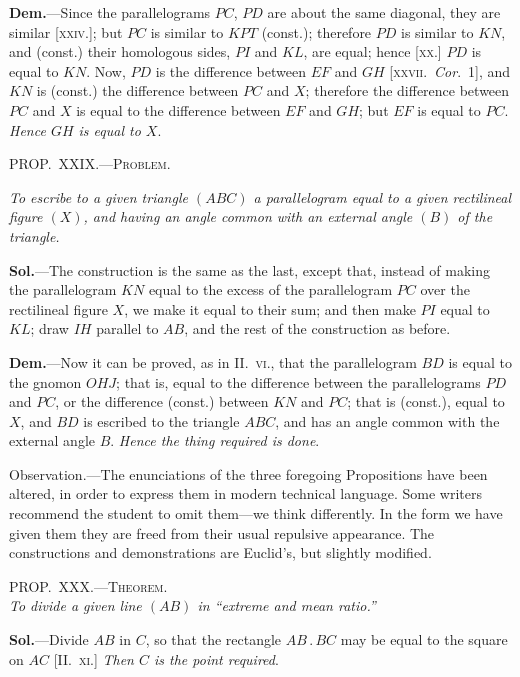 \documentclass[oneside]{book}
\newcommand\myprop[2]{
\bigskip\Needspace*{4\baselineskip}\begin{center}\textsc{#1}\\\medskip\emph{#2}\par\end{center}
}
\newcommand\mypropl[2]{
\bigskip\Needspace*{4\baselineskip}\begin{center}\textsc{#1}\end{center}
\hspace{\parindent}\emph{#2}\par\medskip
}
\newcommand\imgcent[2]{
\begin{center}
\end{center}
}
\begin{document}
\imgcent{200}{f208}

\textbf{Dem.}---Since the parallelograms $PC$, $PD$ are about
the same diagonal, they are similar [\textsc{xxiv.}]; but $PC$ is
similar to $KPT$ (const.); therefore $PD$ is similar to $KN$,
and (const.) their homologous sides, $PI$ and $KL$, are
equal; hence [\textsc{xx.}] $PD$ is equal to $KN$. Now, $PD$ is
the difference between $EF$ and $GH$ [\textsc{xxvii.}\ \textit{Cor}.~1], and
$KN$ is (const.) the difference between $PC$ and $X$; therefore
the difference between $PC$ and $X$ is equal to the
difference between $EF$ and $GH$; but $EF$ is equal to $PC$.
\emph{Hence $GH$ is equal to $X$}.

\mypropl{PROP\@.~XXIX\@.---Problem.}{To escribe to a given triangle $(ABC)$ a parallelogram
equal to a given rectilineal figure $(X)$, and having an
angle common with an external angle $(B)$ of the triangle.}

\textbf{Sol.}---The construction is the same as the last,
except that, instead of making the parallelogram $KN$
equal to the excess of the parallelogram $PC$ over the
rectilineal figure $X$, we make it equal to their sum;
and then make $PI$ equal to $KL$; draw $IH$ parallel to
$AB$, and the rest of the construction as before.

\imgcent{280}{f209}

\textbf{Dem.}---Now it can be proved, as in II\@.~\textsc{vi}., that
the parallelogram $BD$ is equal to the gnomon $OHJ$;
that is, equal to the difference between the parallelograms
$PD$ and $PC$, or the difference (const.) between
$KN$ and $PC$; that is (const.), equal to $X$, and $BD$ is
escribed to the triangle $ABC$, and has an angle common
with the external angle $B$. \textit{Hence the thing required
is done}.

\smallskip
\begin{footnotesize}
\textsf{Observation.}---The enunciations of the three foregoing Propositions
have been altered, in order to express them in modern
technical language. Some writers recommend the student to
omit them---we think differently. In the form we have given
them they are freed from their usual repulsive appearance. The
constructions and demonstrations are Euclid's, but slightly modified.
\par\end{footnotesize}


\myprop{PROP\@.~XXX\@.---Theorem.}{To divide a given line $(AB)$ in ``extreme and mean ratio.''}

\textbf{Sol.}---Divide $AB$ in $C$, so that the rectangle $AB\,.\,BC$
may be equal to the square on $AC$
[II\@.~\textsc{xi}.] \textit{Then $C$ is the point required}.
\end{document}
